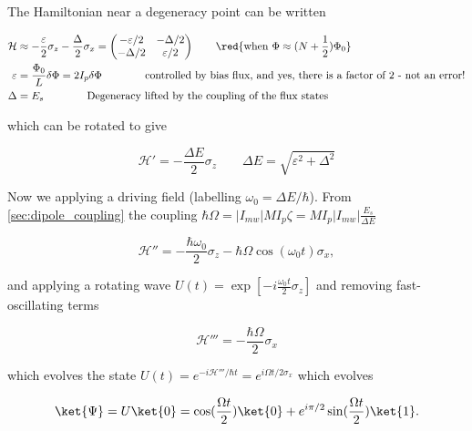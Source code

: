 \begin{framed}\noindent
  The Hamiltonian near a degeneracy point can be written

  \begin{equation}
    \begin{aligned}
      \mathcal{H}        &\approx        -\frac{\varepsilon}{2}\sigma_z        -
      \frac{\Delta}{2}\sigma_x = \begin{pmatrix}
        -\varepsilon/2  &  -\Delta/2 \\
        -\Delta/2 & \varepsilon/2
      \end{pmatrix} \qquad \red{\text{when } \Phi\approx(N+\frac{1}{2})\Phi_0} \\
      \varepsilon & = \frac{\Phi_0}{L}\delta\Phi = 2I_p\delta\Phi  \qquad\qquad \text{controlled by bias flux, and yes, there is a factor of 2 - not an error!}\\
      \Delta & = E_s \qquad\qquad\text{Degeneracy  lifted by the coupling of the
        flux states}
    \end{aligned}
  \end{equation}

  \noindent which can be rotated to give

  \begin{equation}
    \mathcal{H'} = -\frac{\Delta E}{2}\sigma_z \qquad \Delta E = \sqrt{\varepsilon^2 + \Delta^2}
  \end{equation}

  \noindent     Now    we     applying     a     driving    field     (labelling
  $\omega_0=\Delta E/\hbar$).   From \autoref{sec:dipole_coupling}  the coupling
  $\hbar\Omega=                  \left|I_{mw}\right|MI_p\zeta                  =
  MI_p\left|I_{mw}\right|\frac{E_s}{\Delta E}$

    \begin{equation}
      \mathcal{H}'' = -\frac{\hbar\omega_0}{2}\sigma_z-\hbar\Omega\cos(\omega_0 t)\sigma_x,
    \end{equation}

    \noindent         and        applying         a        rotating         wave
    $U(t)  =   \exp\left[-i\frac{\omega_0  t}{2}\sigma_z\right]$   and  removing
    fast-oscillating terms

    \begin{equation}
      \mathcal{H}''' = -\frac{\hbar\Omega}{2}\sigma_x
    \end{equation}

    \noindent            which            evolves           the            state
    $U(t)  =  e^{-i\mathcal{H}'''/\hbar  t}  =  e^{i\Omega  t/2\sigma_x}$  which
    evolves

    \begin{equation}
      \ket{\Psi} = U\ket{0} = \cos(\frac{\Omega t}{2})\ket{0}+e^{i\pi/2}\sin(\frac{\Omega t}{2})\ket{1}.
    \end{equation}

    \noindent {}
  \end{framed}

